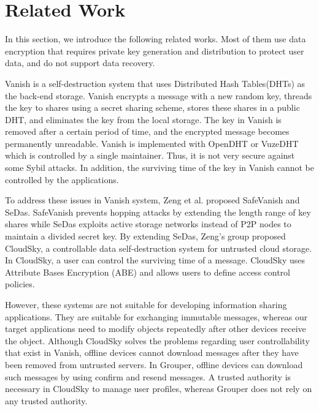 \documentclass{sig-alternate-05-2015}
\begin{document}
\section{Related Work}

In this section, we introduce the following related works. 
Most of them use data encryption that requires private key generation and distribution to protect user data, and do not support data recovery.

Vanish\cite{geambasu2009vanish} is a self-destruction system that uses Distributed Hash Tables(DHTs) as the back-end storage.
Vanish encrypts a message with a new random key, threads the key to shares using a secret sharing scheme, stores these shares in a public DHT, and eliminates the key from the local storage.
The key in Vanish is removed after a certain period of time, and the encrypted message becomes permanently unreadable.
Vanish is implemented with OpenDHT\cite{rhea2005opendht} or VuzeDHT\cite{vuzedht} which is controlled by a single maintainer. 
Thus, it is not very secure against some Sybil attacks\cite{wolchok2010defeating}. 
In addition, the surviving time of the key in Vanish cannot be controlled by the applications. 

To address these issues in Vanish system, Zeng et al. proposed SafeVanish\cite{zeng2010safevanish} and SeDas\cite{zeng2012sedas}. 
SafeVanish prevents hopping attacks by extending the length range of key shares while SeDas exploits active storage networks instead of P2P nodes to maintain a divided secret key. By extending SeDas, Zeng's group proposed CloudSky\cite{zeng2015cloudsky}, a controllable data self-destruction system for untrusted cloud storage. 
In CloudSky, a user can control the surviving time of a message.
CloudSky uses Attribute Bases Encryption (ABE) and allows users to define access control policies.

However, these systems are not suitable for developing information sharing applications. 
They are suitable for exchanging immutable messages, whereas our target applications need to modify objects repeatedly after other devices receive the object. 
Although CloudSky solves the problems regarding user controllability that exist in Vanish, offline devices cannot download messages after they have been removed from untrusted servers.
In Grouper, offline devices can download such messages by using confirm and resend messages.
A trusted authority is necessary in CloudSky to manage user profiles, whereas Grouper does not rely on any trusted authority.
\end{document}
